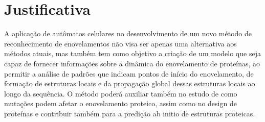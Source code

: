 \chapter{Justificativa}

A aplicação de autômatos celulares no desenvolvimento de um novo método de
reconhecimento de enovelamentos não visa ser apenas uma alternativa aos métodos atuais, mas
também tem como objetivo a criação de um modelo que seja capaz de fornecer informações
sobre a dinâmica do enovelamento de proteínas, ao permitir a análise de padrões que indicam
pontos de início do enovelamento, de formação de estruturas locais e da propagação global
dessas estruturas locais ao longo da sequência. O método poderá auxiliar também no estudo de
como mutações podem afetar o enovelamento proteico, assim como no design de proteínas e
contribuir também para a predição ab initio de estruturas proteicas.